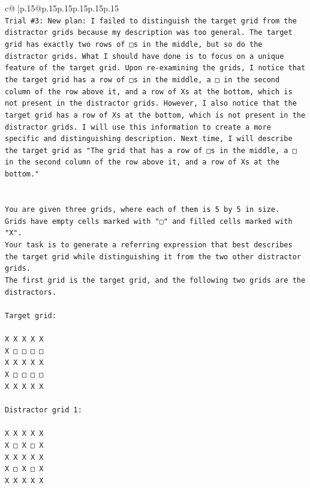 \documentclass{article}
\begin{document}
{\begin{supertabular}{c@{$\;$}|p{.15\linewidth}@{}p{.15\linewidth}p{.15\linewidth}p{.15\linewidth}p{.15\linewidth}p{.15\linewidth}}
{{{\\ 
\texttt{Trial \#3: New plan: I failed to distinguish the target grid from the distractor grids because my description was too general. The target grid has exactly two rows of □s in the middle, but so do the distractor grids. What I should have done is to focus on a unique feature of the target grid. Upon re{-}examining the grids, I notice that the target grid has a row of □s in the middle, a □ in the second column of the row above it, and a row of Xs at the bottom, which is not present in the distractor grids. However, I also notice that the target grid has a row of Xs at the bottom, which is not present in the distractor grids. I will use this information to create a more specific and distinguishing description. Next time, I will describe the target grid as "The grid that has a row of □s in the middle, a □ in the second column of the row above it, and a row of Xs at the bottom."} \\
\\ 
\\ 
\texttt{You are given three grids, where each of them is 5 by 5 in size.} \\
\texttt{Grids have empty cells marked with "▢" and filled cells marked with "X".} \\
\texttt{Your task is to generate a referring expression that best describes the target grid while distinguishing it from the two other distractor grids.} \\
\texttt{The first grid is the target grid, and the following two grids are the distractors.} \\
\\ 
\texttt{Target grid:} \\
\\ 
\texttt{X X X X X} \\
\texttt{X □ □ □ □} \\
\texttt{X X X X X} \\
\texttt{X □ □ □ □} \\
\texttt{X X X X X} \\
\\ 
\texttt{Distractor grid 1:} \\
\\ 
\texttt{X X X X X} \\
\texttt{X □ X □ X} \\
\texttt{X X X X X} \\
\texttt{X □ X □ X} \\
\texttt{X X X X X} \\
\\ 
}}}
\end{supertabular}}
\end{document}
